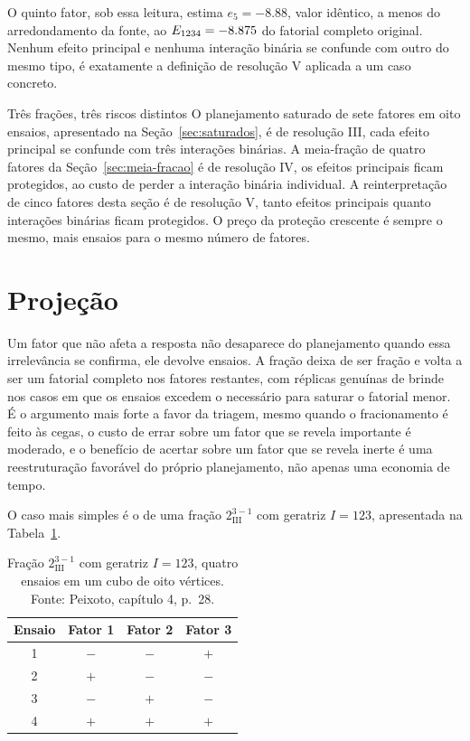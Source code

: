 \documentclass{doeapostila}
\begin{document}
O quinto fator, sob essa leitura, estima $e_{5} = \num{-8.88}$, valor
idêntico, a menos do arredondamento da fonte, ao $E_{1234} =
\num{-8.875}$ do fatorial completo original. Nenhum efeito principal e
nenhuma interação binária se confunde com outro do mesmo tipo, é exatamente a
definição de resolução V aplicada a um caso concreto.

\begin{aplicacao}{Três frações, três riscos distintos}
  O planejamento saturado de sete fatores em oito ensaios, apresentado na
  Seção~\ref{sec:saturados}, é de resolução III, cada efeito principal se
  confunde com três interações binárias. A meia-fração de quatro fatores da
  Seção~\ref{sec:meia-fracao} é de resolução IV, os efeitos principais ficam
  protegidos, ao custo de perder a interação binária individual. A
  reinterpretação de cinco fatores desta seção é de resolução V, tanto
  efeitos principais quanto interações binárias ficam protegidos. O preço da
  proteção crescente é sempre o mesmo, mais ensaios para o mesmo número de
  fatores.
\end{aplicacao}

\section{Projeção}
\label{sec:projecao}

Um fator que não afeta a resposta não desaparece do planejamento quando essa
irrelevância se confirma, ele devolve ensaios. A fração deixa de ser fração e
volta a ser um fatorial completo nos fatores restantes, com réplicas
genuínas de brinde nos casos em que os ensaios excedem o necessário para
saturar o fatorial menor. É o argumento mais forte a favor da triagem, mesmo
quando o fracionamento é feito às cegas, o custo de errar sobre um fator que
se revela importante é moderado, e o benefício de acertar sobre um fator que
se revela inerte é uma reestruturação favorável do próprio planejamento, não
apenas uma economia de tempo.

O caso mais simples é o de uma fração $2^{3-1}_{\mathrm{III}}$ com geratriz
$I = 123$, apresentada na Tabela~\ref{tab:projecao}.

\begin{table}[H]
  \centering
  \caption{Fração $2^{3-1}_{\mathrm{III}}$ com geratriz $I = 123$, quatro
    ensaios em um cubo de oito vértices. Fonte: Peixoto, capítulo 4, p.~28.}
  \label{tab:projecao}
  \begin{tabular}{c c c c}
    \toprule
    Ensaio & Fator 1 & Fator 2 & Fator 3 \\
    \midrule
    1 & $-$ & $-$ & $+$ \\
    2 & $+$ & $-$ & $-$ \\
    3 & $-$ & $+$ & $-$ \\
    4 & $+$ & $+$ & $+$ \\
    \bottomrule
  \end{tabular}
\end{table}
\end{document}
